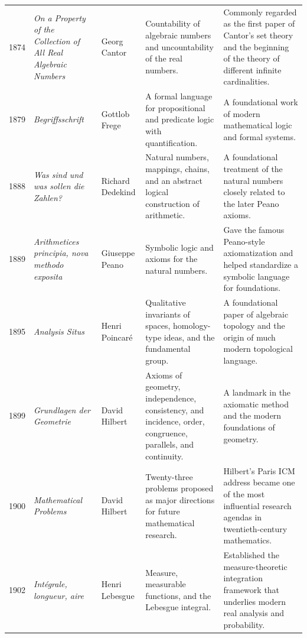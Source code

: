 {\begin{longtable}{@{}L{0.08\textwidth}L{0.21\textwidth}L{0.15\textwidth}L{0.22\textwidth}L{0.26\textwidth}@{}}
        1874
        & \textit{On a Property of the Collection of All Real Algebraic Numbers}
        & Georg Cantor
        & Countability of algebraic numbers and uncountability of the real numbers.
        & Commonly regarded as the first paper of Cantor's set theory and the beginning of the theory of different infinite cardinalities. \\

        1879
        & \textit{Begriffsschrift}
        & Gottlob Frege
        & A formal language for propositional and predicate logic with quantification.
        & A foundational work of modern mathematical logic and formal systems. \\

        1888
        & \textit{Was sind und was sollen die Zahlen?}
        & Richard Dedekind
        & Natural numbers, mappings, chains, and an abstract logical construction of arithmetic.
        & A foundational treatment of the natural numbers closely related to the later Peano axioms. \\

        1889
        & \textit{Arithmetices principia, nova methodo exposita}
        & Giuseppe Peano
        & Symbolic logic and axioms for the natural numbers.
        & Gave the famous Peano-style axiomatization and helped standardize a symbolic language for foundations. \\

        1895
        & \textit{Analysis Situs}
        & Henri Poincar\'e
        & Qualitative invariants of spaces, homology-type ideas, and the fundamental group.
        & A foundational paper of algebraic topology and the origin of much modern topological language. \\

        1899
        & \textit{Grundlagen der Geometrie}
        & David Hilbert
        & Axioms of geometry, independence, consistency, and incidence, order, congruence, parallels, and continuity.
        & A landmark in the axiomatic method and the modern foundations of geometry. \\

        1900
        & \textit{Mathematical Problems}
        & David Hilbert
        & Twenty-three problems proposed as major directions for future mathematical research.
        & Hilbert's Paris ICM address became one of the most influential research agendas in twentieth-century mathematics. \\

        1902
        & \textit{Int\'egrale, longueur, aire}
        & Henri Lebesgue
        & Measure, measurable functions, and the Lebesgue integral.
        & Established the measure-theoretic integration framework that underlies modern real analysis and probability. \\


\end{longtable}}
